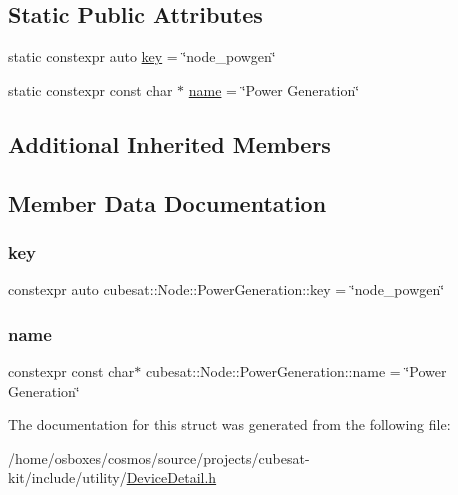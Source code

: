 \subsection*{Static Public Attributes}
\begin{DoxyCompactItemize}
\item 
static constexpr auto \hyperlink{structcubesat_1_1Node_1_1PowerGeneration_af48c2b095fe2982e99d16e3c291ccc87}{key} = \char`\"{}node\+\_\+powgen\char`\"{}
\item 
static constexpr const char $\ast$ \hyperlink{structcubesat_1_1Node_1_1PowerGeneration_a076b9debf2e98be02ead5aae6d5f23f2}{name} = \char`\"{}Power Generation\char`\"{}
\end{DoxyCompactItemize}
\subsection*{Additional Inherited Members}


\subsection{Member Data Documentation}
\mbox{\label{structcubesat_1_1Node_1_1PowerGeneration_af48c2b095fe2982e99d16e3c291ccc87}} 
\subsubsection{\texorpdfstring{key}{key}}
{\footnotesize\ttfamily constexpr auto cubesat\+::\+Node\+::\+Power\+Generation\+::key = \char`\"{}node\+\_\+powgen\char`\"{}\hspace{0.3cm}{\ttfamily [static]}}

\mbox{\label{structcubesat_1_1Node_1_1PowerGeneration_a076b9debf2e98be02ead5aae6d5f23f2}} 
\subsubsection{\texorpdfstring{name}{name}}
{\footnotesize\ttfamily constexpr const char$\ast$ cubesat\+::\+Node\+::\+Power\+Generation\+::name = \char`\"{}Power Generation\char`\"{}\hspace{0.3cm}{\ttfamily [static]}}



The documentation for this struct was generated from the following file\+:\begin{DoxyCompactItemize}
\item 
/home/osboxes/cosmos/source/projects/cubesat-\/kit/include/utility/\hyperlink{DeviceDetail_8h}{Device\+Detail.\+h}\end{DoxyCompactItemize}
